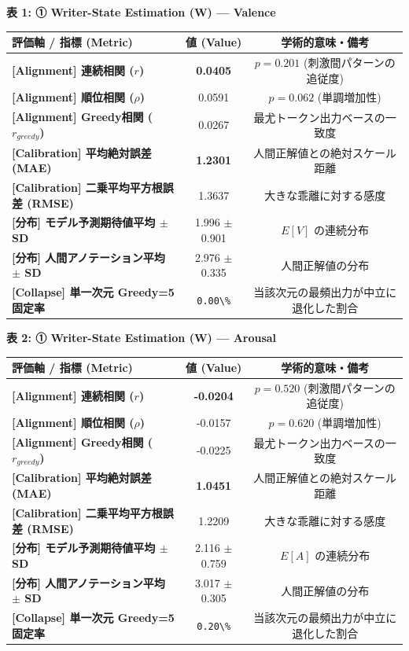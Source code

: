 \textbf{表 1: ① Writer-State Estimation (W) — Valence}
\begin{center}
\small
\begin{tabular}{lcc}
\toprule
\textbf{評価軸 / 指標 (Metric)} & \textbf{値 (Value)} & \textbf{学術的意味・備考} \\
\midrule
\textbf{[Alignment] 連続相関 ($r$)} & \textbf{0.0405} & $p = 0.201 $ (刺激間パターンの追従度) \\
\textbf{[Alignment] 順位相関 ($\rho$)} & 0.0591 & $p = 0.062 $ (単調増加性) \\
\textbf{[Alignment] Greedy相関 ($r_{greedy}$)} & 0.0267 & 最尤トークン出力ベースの一致度 \\
\textbf{[Calibration] 平均絶対誤差 (MAE)} & \textbf{1.2301} & 人間正解値との絶対スケール距離 \\
\textbf{[Calibration] 二乗平均平方根誤差 (RMSE)} & 1.3637 & 大きな乖離に対する感度 \\
\textbf{[分布] モデル予測期待値平均 $\pm$ SD} & 1.996 $\pm$ 0.901 & $E[V]$ の連続分布 \\
\textbf{[分布] 人間アノテーション平均 $\pm$ SD} & 2.976 $\pm$ 0.335 & 人間正解値の分布 \\
\textbf{[Collapse] 単一次元 Greedy=5 固定率} & \texttt{0.00\textbackslash{}\%} & 当該次元の最頻出力が中立に退化した割合 \\
\bottomrule
\end{tabular}
\end{center}


\textbf{表 2: ① Writer-State Estimation (W) — Arousal}
\begin{center}
\small
\begin{tabular}{lcc}
\toprule
\textbf{評価軸 / 指標 (Metric)} & \textbf{値 (Value)} & \textbf{学術的意味・備考} \\
\midrule
\textbf{[Alignment] 連続相関 ($r$)} & \textbf{-0.0204} & $p = 0.520 $ (刺激間パターンの追従度) \\
\textbf{[Alignment] 順位相関 ($\rho$)} & -0.0157 & $p = 0.620 $ (単調増加性) \\
\textbf{[Alignment] Greedy相関 ($r_{greedy}$)} & -0.0225 & 最尤トークン出力ベースの一致度 \\
\textbf{[Calibration] 平均絶対誤差 (MAE)} & \textbf{1.0451} & 人間正解値との絶対スケール距離 \\
\textbf{[Calibration] 二乗平均平方根誤差 (RMSE)} & 1.2209 & 大きな乖離に対する感度 \\
\textbf{[分布] モデル予測期待値平均 $\pm$ SD} & 2.116 $\pm$ 0.759 & $E[A]$ の連続分布 \\
\textbf{[分布] 人間アノテーション平均 $\pm$ SD} & 3.017 $\pm$ 0.305 & 人間正解値の分布 \\
\textbf{[Collapse] 単一次元 Greedy=5 固定率} & \texttt{0.20\textbackslash{}\%} & 当該次元の最頻出力が中立に退化した割合 \\
\bottomrule
\end{tabular}
\end{center}


